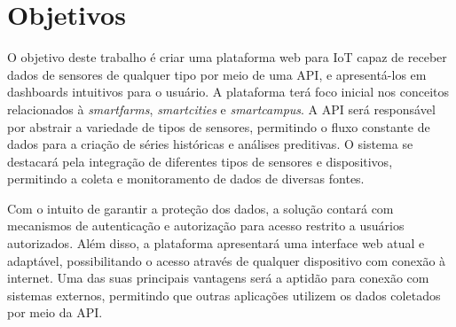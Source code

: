 \documentclass[tcc,capa]{texufpel}
\begin{document}
\section{Objetivos}
O objetivo deste trabalho é criar uma plataforma web para IoT capaz de receber dados de sensores de qualquer tipo por meio de uma API, e apresentá-los em dashboards intuitivos para o usuário. A plataforma terá foco inicial nos conceitos relacionados à \textit{smartfarms}, \textit{smartcities} e \textit{smartcampus}. A API será responsável por abstrair a variedade de tipos de sensores, permitindo o fluxo constante de dados para a criação de séries históricas e análises preditivas. O sistema se destacará pela integração de diferentes tipos de sensores e dispositivos, permitindo a coleta e monitoramento de dados de diversas fontes.

Com o intuito de garantir a proteção dos dados, a solução contará com mecanismos de autenticação e autorização para acesso restrito a usuários autorizados. Além disso, a plataforma apresentará uma interface web atual e adaptável, possibilitando o acesso através de qualquer dispositivo com conexão à internet. Uma das suas principais vantagens será a aptidão para conexão com sistemas externos, permitindo que outras aplicações utilizem os dados coletados por meio da API.

\end{document}
